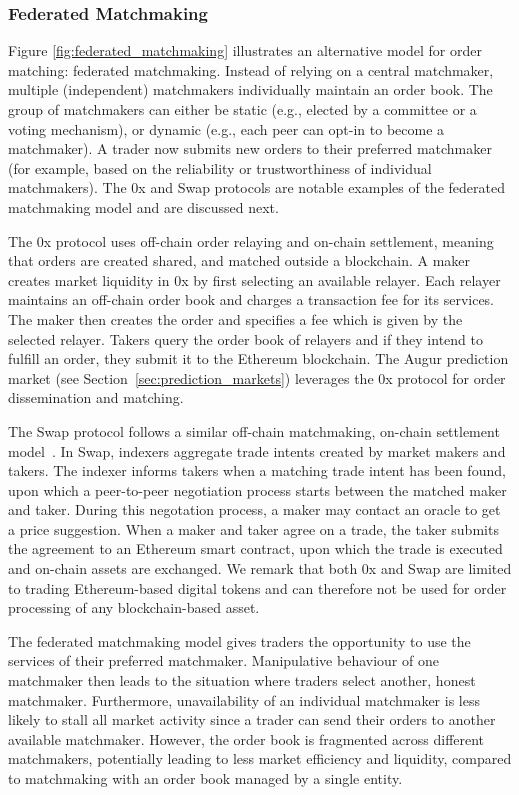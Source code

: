 \subsubsection{Federated Matchmaking}
Figure \ref{fig:federated_matchmaking} illustrates an alternative model for order matching: federated matchmaking.
Instead of relying on a central matchmaker, multiple (independent) matchmakers individually maintain an order book.
The group of matchmakers can either be static (e.g., elected by a committee or a voting mechanism), or dynamic (e.g., each peer can opt-in to become a matchmaker).
A trader now submits new orders to their preferred matchmaker (for example, based on the reliability or trustworthiness of individual matchmakers).
The 0x and Swap protocols are notable examples of the federated matchmaking model and are discussed next.

The 0x protocol uses off-chain order relaying and on-chain settlement, meaning that orders are created shared, and matched outside a blockchain.
A maker creates market liquidity in 0x by first selecting an available relayer.
Each relayer maintains an off-chain order book and charges a transaction fee for its services.
The maker then creates the order and specifies a fee which is given by the selected relayer.
Takers query the order book of relayers and if they intend to fulfill an order, they submit it to the Ethereum blockchain.
The Augur prediction market (see Section~\ref{sec:prediction_markets}) leverages the 0x protocol for order dissemination and matching.

The Swap protocol follows a similar off-chain matchmaking, on-chain settlement model~\cite{oved2017swap}.
In Swap, indexers aggregate trade intents created by market makers and takers.
The indexer informs takers when a matching trade intent has been found, upon which a peer-to-peer negotiation process starts between the matched maker and taker.
During this negotation process, a maker may contact an oracle to get a price suggestion.
When a maker and taker agree on a trade, the taker submits the agreement to an Ethereum smart contract, upon which the trade is executed and on-chain assets are exchanged.
We remark that both 0x and Swap are limited to trading Ethereum-based digital tokens and can therefore not be used for order processing of any blockchain-based asset.

The federated matchmaking model gives traders the opportunity to use the services of their preferred matchmaker.
Manipulative behaviour of one matchmaker then leads to the situation where traders select another, honest matchmaker.
Furthermore, unavailability of an individual matchmaker is less likely to stall all market activity since a trader can send their orders to another available matchmaker.
However, the order book is fragmented across different matchmakers, potentially leading to less market efficiency and liquidity, compared to matchmaking with an order book managed by a single entity.

